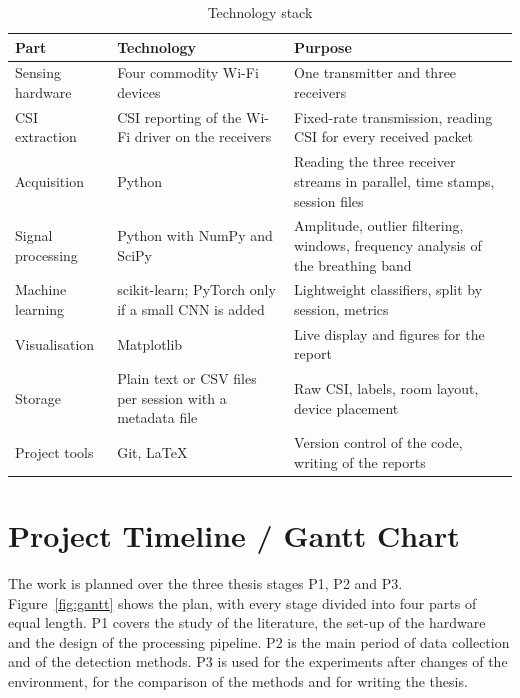 \begin{table}[htbp]
\centering
\small
\caption{Technology stack}\label{tab:stack}
\begin{tabular}{L{3.0cm}L{4.4cm}L{6.0cm}}
\toprule
\textbf{Part} & \textbf{Technology} & \textbf{Purpose}\\
\midrule
Sensing hardware & Four commodity Wi-Fi devices & One transmitter and three receivers\\\addlinespace
CSI extraction & CSI reporting of the Wi-Fi driver on the receivers & Fixed-rate transmission, reading CSI for every received packet\\\addlinespace
Acquisition & Python & Reading the three receiver streams in parallel, time stamps, session files\\\addlinespace
Signal processing & Python with NumPy and SciPy & Amplitude, outlier filtering, windows, frequency analysis of the breathing band\\\addlinespace
Machine learning & scikit-learn; PyTorch only if a small CNN is added & Lightweight classifiers, split by session, metrics\\\addlinespace
Visualisation & Matplotlib & Live display and figures for the report\\\addlinespace
Storage & Plain text or CSV files per session with a metadata file & Raw CSI, labels, room layout, device placement\\\addlinespace
Project tools & Git, \LaTeX & Version control of the code, writing of the reports\\
\bottomrule
\end{tabular}
\end{table}

\section{Project Timeline / Gantt Chart}
The work is planned over the three thesis stages P1, P2 and P3. Figure~\ref{fig:gantt} shows the plan, with every stage divided into four parts of equal length. P1 covers the study of the literature, the set-up of the hardware and the design of the processing pipeline. P2 is the main period of data collection and of the detection methods. P3 is used for the experiments after changes of the environment, for the comparison of the methods and for writing the thesis.

